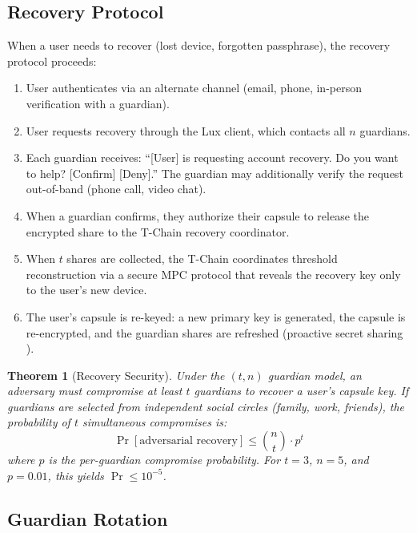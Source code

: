 \documentclass[11pt,a4paper]{article}
\newtheorem{theorem}{Theorem}
\begin{document}
\subsection{Recovery Protocol}

When a user needs to recover (lost device, forgotten passphrase), the
recovery protocol proceeds:

\begin{enumerate}
    \item User authenticates via an alternate channel (email, phone, in-person
    verification with a guardian).
    \item User requests recovery through the Lux client, which contacts all
    $n$ guardians.
    \item Each guardian receives: ``[User] is requesting account recovery.
    Do you want to help? [Confirm] [Deny].'' The guardian may additionally
    verify the request out-of-band (phone call, video chat).
    \item When a guardian confirms, they authorize their capsule to release
    the encrypted share to the T-Chain recovery coordinator.
    \item When $t$ shares are collected, the T-Chain coordinates threshold
    reconstruction via a secure MPC protocol that reveals the recovery key
    only to the user's new device.
    \item The user's capsule is re-keyed: a new primary key is generated,
    the capsule is re-encrypted, and the guardian shares are refreshed
    (proactive secret sharing \cite{herzberg1995proactive}).
\end{enumerate}

\begin{theorem}[Recovery Security]
Under the $(t, n)$ guardian model, an adversary must compromise at least
$t$ guardians to recover a user's capsule key. If guardians are selected
from independent social circles (family, work, friends), the probability
of $t$ simultaneous compromises is:
\begin{equation}
    \Pr[\text{adversarial recovery}] \leq \binom{n}{t} \cdot p^t
\end{equation}
where $p$ is the per-guardian compromise probability. For $t = 3$, $n = 5$,
and $p = 0.01$, this yields $\Pr \leq 10^{-5}$.
\end{theorem}

\subsection{Guardian Rotation}
\end{document}
